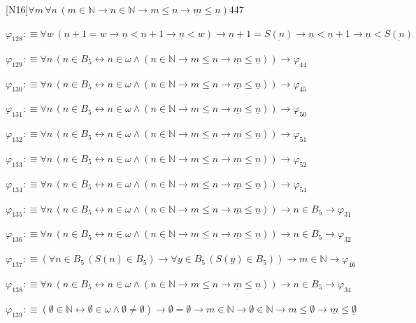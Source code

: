 \begin{fullproof}{[N16]}{$\forall m\,\forall n\,(m \in \mathbb{N} \to n \in \mathbb{N} \to m \leq n \to \underline{m} \leq \underline{n})$}{447}
\begin{abbrevlist}
\item $\varphi_{128} :\equiv \forall w\,(\underline{n} + 1 = w \to \underline{n} < \underline{n} + 1 \to \underline{n} < w) \to \underline{n} + 1 = \underline{S(n)} \to \underline{n} < \underline{n} + 1 \to \underline{n} < \underline{S(n)}$
\item $\varphi_{129} :\equiv \forall n\,(n \in B_{5} \leftrightarrow n \in \omega \land (n \in \mathbb{N} \to m \leq n \to \underline{m} \leq \underline{n})) \to \varphi_{44}$
\item $\varphi_{130} :\equiv \forall n\,(n \in B_{5} \leftrightarrow n \in \omega \land (n \in \mathbb{N} \to m \leq n \to \underline{m} \leq \underline{n})) \to \varphi_{45}$
\item $\varphi_{131} :\equiv \forall n\,(n \in B_{5} \leftrightarrow n \in \omega \land (n \in \mathbb{N} \to m \leq n \to \underline{m} \leq \underline{n})) \to \varphi_{50}$
\item $\varphi_{132} :\equiv \forall n\,(n \in B_{5} \leftrightarrow n \in \omega \land (n \in \mathbb{N} \to m \leq n \to \underline{m} \leq \underline{n})) \to \varphi_{51}$
\item $\varphi_{133} :\equiv \forall n\,(n \in B_{5} \leftrightarrow n \in \omega \land (n \in \mathbb{N} \to m \leq n \to \underline{m} \leq \underline{n})) \to \varphi_{52}$
\item $\varphi_{134} :\equiv \forall n\,(n \in B_{5} \leftrightarrow n \in \omega \land (n \in \mathbb{N} \to m \leq n \to \underline{m} \leq \underline{n})) \to \varphi_{54}$
\item $\varphi_{135} :\equiv \forall n\,(n \in B_{5} \leftrightarrow n \in \omega \land (n \in \mathbb{N} \to m \leq n \to \underline{m} \leq \underline{n})) \to n \in B_{5} \to \varphi_{31}$
\item $\varphi_{136} :\equiv \forall n\,(n \in B_{5} \leftrightarrow n \in \omega \land (n \in \mathbb{N} \to m \leq n \to \underline{m} \leq \underline{n})) \to n \in B_{5} \to \varphi_{32}$
\item $\varphi_{137} :\equiv (\forall n \in B_{5}\,(S(n) \in B_{5}) \to \forall y \in B_{5}\,(S(y) \in B_{5})) \to m \in \mathbb{N} \to \varphi_{46}$
\item $\varphi_{138} :\equiv \forall n\,(n \in B_{5} \leftrightarrow n \in \omega \land (n \in \mathbb{N} \to m \leq n \to \underline{m} \leq \underline{n})) \to n \in B_{5} \to \varphi_{34}$
\item $\varphi_{139} :\equiv (\emptyset \in \mathbb{N} \leftrightarrow \emptyset \in \omega \land \emptyset \neq \emptyset) \to \emptyset = \emptyset \to m \in \mathbb{N} \to \emptyset \in \mathbb{N} \to m \leq \emptyset \to \underline{m} \leq \underline{\emptyset}$

\end{abbrevlist}
\end{fullproof}
